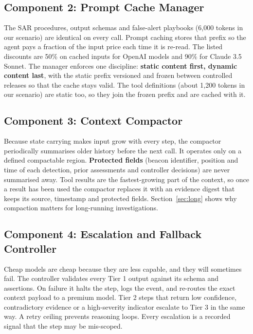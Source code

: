 \documentclass[conference]{IEEEtran}
\begin{document}
\subsection{Component 2: Prompt Cache Manager}

The SAR procedures, output schemas and false-alert playbooks (6,000 tokens in our scenario) are identical on every call. Prompt caching stores that prefix so the agent pays a fraction of the input price each time it is re-read. The listed discounts are 50\% on cached inputs for OpenAI models and 90\% for Claude 3.5 Sonnet. The manager enforces one discipline: \textbf{static content first, dynamic content last}, with the static prefix versioned and frozen between controlled releases so that the cache stays valid. The tool definitions (about 1,200 tokens in our scenario) are static too, so they join the frozen prefix and are cached with it.

\subsection{Component 3: Context Compactor}

Because state carrying makes input grow with every step, the compactor periodically summarises older history before the next call. It operates only on a defined compactable region. \textbf{Protected fields} (beacon identifier, position and time of each detection, prior assessments and controller decisions) are never summarised away. Tool results are the fastest-growing part of the context, so once a result has been used the compactor replaces it with an evidence digest that keeps its source, timestamp and protected fields. Section~\ref{sec:long} shows why compaction matters for long-running investigations.

\subsection{Component 4: Escalation and Fallback Controller}
\label{sec:escal}

Cheap models are cheap because they are less capable, and they will sometimes fail. The controller validates every Tier 1 output against its schema and assertions. On failure it halts the step, logs the event, and re-routes the exact context payload to a premium model. Tier 2 steps that return low confidence, contradictory evidence or a high-severity indicator escalate to Tier 3 in the same way. A retry ceiling prevents reasoning loops. Every escalation is a recorded signal that the step may be mis-scoped.
\end{document}
